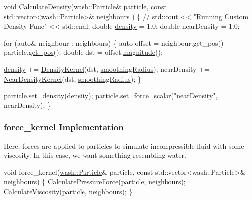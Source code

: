 \begin{DoxyCode}
\textcolor{keywordtype}{void} CalculateDensity(\mbox{\hyperlink{classwash_1_1Particle}{wash::Particle}}& particle, \textcolor{keyword}{const} std::vector<wash::Particle>& neighbours
      ) \{
    \textcolor{comment}{// std::cout << "Running Custom Density Func" << std::endl;}
    \textcolor{keywordtype}{double} \mbox{\hyperlink{3d__fluid__sim_2fluid__sim_8cpp_a140d94d7edb97c062961056d1926a2db}{density}} = 1.0;
    \textcolor{keywordtype}{double} nearDensity = 1.0;

    \textcolor{keywordflow}{for} (\textcolor{keyword}{auto}& neighbour : neighbours) \{
        \textcolor{keyword}{auto} offset = neighbour.get\_pos() - particle.\mbox{\hyperlink{classwash_1_1Particle_a9d222d453d640cf629ee8dfbee6b43c2}{get\_pos}}();
        \textcolor{keywordtype}{double} dst = offset.\mbox{\hyperlink{classwash_1_1Vec_a41de499daf12160b2cf515ce0c9da70f}{magnitude}}();

        \mbox{\hyperlink{3d__fluid__sim_2fluid__sim_8cpp_a140d94d7edb97c062961056d1926a2db}{density}} += \mbox{\hyperlink{flsim__kernels_8hpp_aa2b224ec4324bc9df6dc05231b0fb1f4}{DensityKernel}}(dst, \mbox{\hyperlink{3d__fluid__sim_2fluid__sim_8cpp_aeb9760a781fb6ccf134ed4353c9888e5}{smoothingRadius}});
        nearDensity += \mbox{\hyperlink{flsim__kernels_8hpp_a24021cba59575fe555fcd996328dfad9}{NearDensityKernel}}(dst, \mbox{\hyperlink{3d__fluid__sim_2fluid__sim_8cpp_aeb9760a781fb6ccf134ed4353c9888e5}{smoothingRadius}});
    \}

    particle.\mbox{\hyperlink{classwash_1_1Particle_a6416678dd509c16c2933d315b6ae6156}{set\_density}}(\mbox{\hyperlink{3d__fluid__sim_2fluid__sim_8cpp_a140d94d7edb97c062961056d1926a2db}{density}});
    particle.\mbox{\hyperlink{classwash_1_1Particle_a2c3038c8eac34e371922bcf1ab79b8ca}{set\_force\_scalar}}(\textcolor{stringliteral}{"nearDensity"}, nearDensity);
\}
\end{DoxyCode}


\subsubsection*{force\+\_\+kernel Implementation}

Here, forces are applied to particles to simulate incompressible fluid with some viscosity. In this case, we want something resembling water. 
\begin{DoxyCode}
\textcolor{keywordtype}{void} force\_kernel(\mbox{\hyperlink{classwash_1_1Particle}{wash::Particle}}& particle, \textcolor{keyword}{const} std::vector<wash::Particle>& neighbours) \{
    CalculatePressureForce(particle, neighbours);
    CalculateViscosity(particle, neighbours);
\}
\end{DoxyCode}



